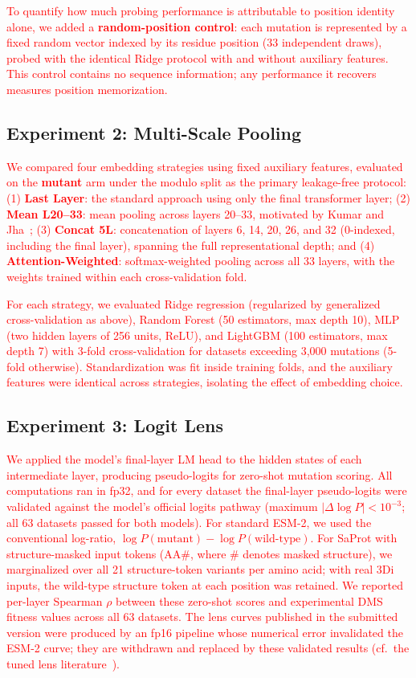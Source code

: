 \documentclass[11pt,a4paper]{article}
\newcommand{\revised}[1]{\textcolor{red}{#1}}
\begin{document}
\revised{To quantify how much probing performance is attributable to position identity
alone, we added a \textbf{random-position control}: each mutation is represented by a
fixed random vector indexed by its residue position (33 independent draws), probed with
the identical Ridge protocol with and without auxiliary features. This control contains
no sequence information; any performance it recovers measures position memorization.}

\subsection{Experiment 2: Multi-Scale Pooling}

\revised{We compared four embedding strategies using fixed auxiliary features,
evaluated on the \textbf{mutant} arm under the modulo split as the primary
leakage-free protocol: (1) \textbf{Last Layer}: the standard approach using only the
final transformer layer;
(2) \textbf{Mean L20--33}: mean pooling across layers 20--33, motivated by
Kumar and Jha~\cite{kumar2025};
(3) \textbf{Concat 5L}: concatenation of layers 6, 14, 20, 26, and 32 (0-indexed,
including the final layer), spanning the full representational depth; and
(4) \textbf{Attention-Weighted}: softmax-weighted pooling across all 33 layers, with
the weights trained within each cross-validation fold.}

\revised{For each strategy, we evaluated Ridge regression (regularized by generalized
cross-validation as above), Random Forest (50 estimators,
max depth 10), MLP (two hidden layers of 256 units, ReLU), and LightGBM (100 estimators,
max depth 7) with 3-fold cross-validation for datasets exceeding 3,000 mutations
(5-fold otherwise). Standardization was fit inside training folds, and the auxiliary
features were identical across strategies, isolating the effect of embedding choice.}

\subsection{Experiment 3: Logit Lens}

\revised{We applied the model's final-layer LM head to the hidden states of each
intermediate layer, producing pseudo-logits for zero-shot mutation scoring. All
computations ran in fp32, and for every dataset the final-layer pseudo-logits were
validated against the model's official logits pathway (maximum $|\Delta \log P| <
10^{-3}$; all 63 datasets passed for both models). For standard ESM-2, we used the
conventional log-ratio, $\log P(\text{mutant}) - \log P(\text{wild-type})$. For SaProt
with structure-masked input tokens ($\text{AA}\#$, where $\#$ denotes masked
structure), we marginalized over all 21 structure-token variants per amino acid; with
real 3Di inputs, the wild-type structure token at each position was retained. We
reported per-layer Spearman $\rho$ between these zero-shot scores and experimental
DMS fitness values across all 63 datasets. The lens curves published in the submitted
version were produced by an fp16 pipeline whose numerical error invalidated the ESM-2
curve; they are withdrawn and replaced by these validated results
(cf.\ the tuned lens literature~\cite{belrose2023eliciting}).}
\end{document}
